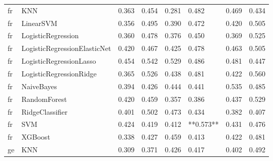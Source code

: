 \begin{tabular}{llllllll}
      fr &                          KNN & 0.363 &                     0.454 &                 0.281 &                  0.482 &                                   0.469 &     0.434 \\
      fr &                    LinearSVM & 0.356 &                     0.495 &                 0.390 &                  0.472 &                                   0.420 &     0.505 \\
      fr &           LogisticRegression & 0.360 &                     0.478 &                 0.376 &                  0.450 &                                   0.369 &     0.525 \\
      fr & LogisticRegressionElasticNet & 0.420 &                     0.467 &                 0.425 &                  0.478 &                                   0.463 &     0.505 \\
      fr &      LogisticRegressionLasso & 0.454 &                     0.542 &                 0.529 &                  0.486 &                                   0.481 &     0.447 \\
      fr &      LogisticRegressionRidge & 0.365 &                     0.526 &                 0.438 &                  0.481 &                                   0.422 &     0.560 \\
      fr &                   NaiveBayes & 0.394 &                     0.426 &                 0.444 &                  0.441 &                                   0.535 &     0.485 \\
      fr &                 RandomForest & 0.420 &                     0.459 &                 0.357 &                  0.386 &                                   0.437 &     0.529 \\
      fr &              RidgeClassifier & 0.401 &                     0.502 &                 0.473 &                  0.434 &                                   0.382 &     0.407 \\
      fr &                          SVM & 0.424 &                     0.419 &                 0.412 &              **0.573** &                                   0.431 &     0.476 \\
      fr &                      XGBoost & 0.338 &                     0.427 &                 0.459 &                  0.413 &                                   0.422 &     0.481 \\
      ge &                          KNN & 0.309 &                     0.371 &                 0.426 &                  0.417 &                                   0.402 &     0.492 \\

\end{tabular}
